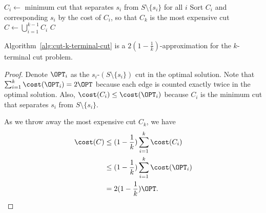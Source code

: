 \begin{algorithm}[H]
	\caption{Minimum Cut-based $k$-terminal Cut Approximation} \label{alg:cut-k-terminal-cut}
	$C_i\gets$ minimum cut that separates $s_i$ from $S\setminus \{s_i\}$ for all $i$\;
	Sort $C_i$ and corresponding $s_i$ by the cost of $C_i$, so that $C_k$ is the most expensive cut\;
	$C \gets \bigcup_{i=1}^{k-1} C_i$\;
	\Return $C$\;
\end{algorithm}
\begin{theorem}
	Algorithm~\ref{alg:cut-k-terminal-cut} is a $2(1-\frac{1}{k})$-approximation for the $k$-terminal cut problem.
\end{theorem}
\begin{proof}
	Denote $\OPT_i$ as the $s_i$-$(S\setminus \{s_i\})$ cut in the optimal solution. Note that $\sum_{i=1}^k \cost(\OPT_i) = 2\OPT$ because each edge is counted exactly twice in the optimal solution. Also, $\cost(C_i) \le \cost(\OPT_i)$ because $C_i$ is the minimum cut that separates $s_i$ from $S\setminus \{s_i\}$.

	As we throw away the most expensive cut $C_k$, we have
	\begin{align*}
		\cost(C) & \le (1-\frac{1}{k})\sum_{i=1}^k \cost(C_i)    \\
		         & \le (1-\frac{1}{k})\sum_{i=1}^k \cost(\OPT_i) \\
		         & = 2(1-\frac{1}{k})\OPT.                       \\
	\end{align*}
\end{proof}
